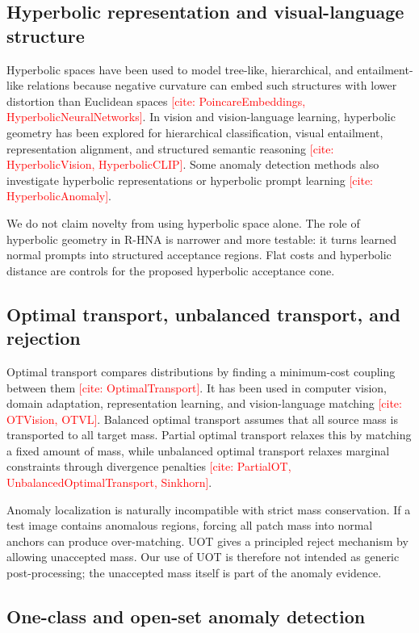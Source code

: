 \documentclass[10pt]{article}
\newcommand{\method}{R-HNA}
\newcommand{\needcite}[1]{\textcolor{red}{[cite: #1]}}
\begin{document}
\subsection{Hyperbolic representation and visual-language structure}

Hyperbolic spaces have been used to model tree-like, hierarchical, and entailment-like relations because negative curvature can embed such structures with lower distortion than Euclidean spaces \needcite{PoincareEmbeddings, HyperbolicNeuralNetworks}.
In vision and vision-language learning, hyperbolic geometry has been explored for hierarchical classification, visual entailment, representation alignment, and structured semantic reasoning \needcite{HyperbolicVision, HyperbolicCLIP}.
Some anomaly detection methods also investigate hyperbolic representations or hyperbolic prompt learning \needcite{HyperbolicAnomaly}.

We do not claim novelty from using hyperbolic space alone.
The role of hyperbolic geometry in \method{} is narrower and more testable: it turns learned normal prompts into structured acceptance regions.
Flat costs and hyperbolic distance are controls for the proposed hyperbolic acceptance cone.

\subsection{Optimal transport, unbalanced transport, and rejection}

Optimal transport compares distributions by finding a minimum-cost coupling between them \needcite{OptimalTransport}.
It has been used in computer vision, domain adaptation, representation learning, and vision-language matching \needcite{OTVision, OTVL}.
Balanced optimal transport assumes that all source mass is transported to all target mass.
Partial optimal transport relaxes this by matching a fixed amount of mass, while unbalanced optimal transport relaxes marginal constraints through divergence penalties \needcite{PartialOT, UnbalancedOptimalTransport, Sinkhorn}.

Anomaly localization is naturally incompatible with strict mass conservation.
If a test image contains anomalous regions, forcing all patch mass into normal anchors can produce over-matching.
UOT gives a principled reject mechanism by allowing unaccepted mass.
Our use of UOT is therefore not intended as generic post-processing; the unaccepted mass itself is part of the anomaly evidence.

\subsection{One-class and open-set anomaly detection}
\end{document}
